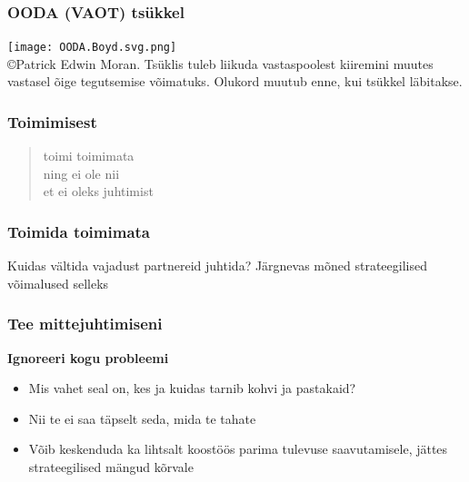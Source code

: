\begin{frame}[fragile]
  \frametitle{OODA (VAOT) tsükkel}

	\begin{center}
		\texttt{[image: OODA.Boyd.svg.png]}\\
		  	©Patrick Edwin Moran. Tsüklis tuleb liikuda vastaspoolest kiiremini muutes vastasel õige tegutsemise võimatuks. Olukord muutub enne, kui tsükkel läbitakse.
	\end{center}
\end{frame}

\begin{frame}[fragile]
  \frametitle{Toimimisest}
	\begin{center}
		\begin{quote}
	toimi toimimata\\
	ning ei ole nii\\
	et ei oleks juhtimist
   		\end{quote}
	\end{center}
\cite{laozi}
\end{frame}

\begin{frame}[fragile]
  \frametitle{Toimida toimimata}
	\begin{center}
			Kuidas vältida vajadust partnereid juhtida?
			\vfill
			Järgnevas mõned strateegilised võimalused selleks
	\end{center}
\end{frame}


\begin{frame}[fragile]
  \frametitle{Tee mittejuhtimiseni}
	\textbf{Ignoreeri kogu probleemi}
	\begin{itemize}
		\item Mis vahet seal on, kes ja kuidas tarnib kohvi ja pastakaid?
		\item Nii te ei saa täpselt seda, mida te tahate
		\item Võib keskenduda ka lihtsalt koostöös parima tulevuse saavutamisele, jättes strateegilised mängud kõrvale
	\end{itemize}
\end{frame}

